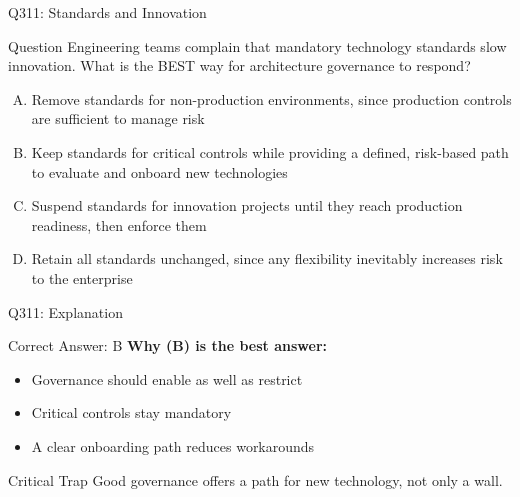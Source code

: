 \documentclass{beamer}
\begin{document}
	\begin{frame}{Q311: Standards and Innovation}
		\begin{block}{Question}
			\small Engineering teams complain that mandatory technology standards slow innovation. What is the BEST way for architecture governance to respond?
		\end{block}
		\begin{enumerate}[(A)]
			\footnotesize
			\item Remove standards for non-production environments, since production controls are sufficient to manage risk
			\item Keep standards for critical controls while providing a defined, risk-based path to evaluate and onboard new technologies
			\item Suspend standards for innovation projects until they reach production readiness, then enforce them
			\item Retain all standards unchanged, since any flexibility inevitably increases risk to the enterprise
		\end{enumerate}
	\end{frame}
	
	\begin{frame}{Q311: Explanation}
		\begin{block}{Correct Answer: B}
			\textbf{Why (B) is the best answer:}
			\begin{itemize}
				\item Governance should enable as well as restrict
				\item Critical controls stay mandatory
				\item A clear onboarding path reduces workarounds
			\end{itemize}
		\end{block}
		\begin{alertblock}{Critical Trap}
			Good governance offers a path for new technology, not only a wall.
		\end{alertblock}
	\end{frame}
	
\end{document}
